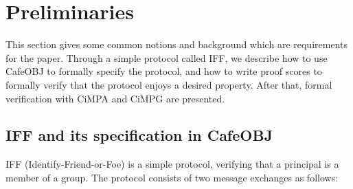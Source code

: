 \documentclass[a4paper,fleqn]{cas-dc}
\begin{document}

\section{Preliminaries}\label{pre}
This section gives some common notions and background which are requirements for the paper. 
Through a simple protocol called IFF, we describe how to use CafeOBJ to formally specify the protocol, and how to write proof scores to formally verify that the protocol enjoys a desired property.
After that, formal verification with CiMPA and CiMPG are presented.

\subsection{IFF and its specification in CafeOBJ} \label{cafeobj}
%
IFF (Identify-Friend-or-Foe) \cite{iff2001} is a simple protocol, verifying that a principal is a member of a group. The protocol consists of two message exchanges as follows:
\end{document}
